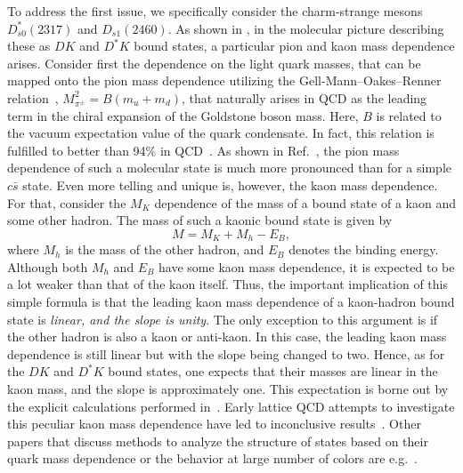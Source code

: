To address the first issue, we specifically consider the charm-strange
mesons $D_{s0}^*(2317)$ and $D_{s1}(2460)$. As shown in \cite{Cleven:2010aw},
in the molecular picture describing these as $DK$ and $D^*K$ bound states,
a particular pion and kaon mass dependence arises. Consider first the
dependence on the light quark masses, that can be mapped onto the
pion mass dependence utilizing the Gell-Mann--Oakes--Renner 
relation~\cite{GellMann:1968rz},
$M_{\pi^\pm}^2 = B(m_u+m_d)$, that naturally arises in QCD as the leading 
term in the chiral expansion of the Goldstone boson mass. Here, $B$ is
related to the vacuum expectation value of the quark condensate. In fact, this
relation is fulfilled to better than 94\% in QCD~\cite{Colangelo:2001sp}.
As shown in Ref.~\cite{Cleven:2010aw}, the pion mass dependence of such
a molecular state is much more pronounced than for a simple $c\bar s$ state.
Even more telling and unique is, however, the kaon mass dependence.
For that, consider the  $M_K$ dependence of the mass of a bound state
of a kaon and some other hadron. The mass of such a kaonic bound state
is given by
\begin{equation}
M = M_K+M_h-E_B,
\end{equation}
where $M_h$ is the mass of the other hadron, and $E_B$ denotes the binding
energy. Although both $M_h$ and $E_B$ have some kaon mass dependence, it is 
expected to be a lot weaker
than that of the kaon itself. Thus, the important implication of this simple 
formula is that the leading
kaon mass dependence of a kaon-hadron bound state is {\em linear, and the 
slope is unity}. The only
exception to this argument is if the other hadron
is also a kaon or anti-kaon. In this case, the
leading kaon mass dependence is still linear but with the 
slope being changed to two.
Hence, as for the $DK$ and $D^*K$ bound states, one expects that
their masses are linear in the kaon mass, and the slope is 
approximately one. This expectation is borne out by
the explicit calculations performed in~\cite{Cleven:2010aw}.
Early lattice QCD attempts to investigate this peculiar kaon mass dependence
have led to inconclusive results~\cite{mcneile}. Other papers that discuss 
methods 
to analyze the structure of states based on their quark mass dependence
or the behavior at large number of colors are 
e.g.~\cite{Hanhart:2008mx,Pelaez:2010fj,Bernard:2010fp,Albaladejo:2012te,
Guo:2011pa,Nebreda:2011cp,Pelaez:2006nj,Guo:2015dha}.

